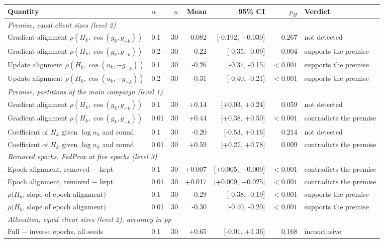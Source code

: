 \begin{tabular}{llrrrrl}
\toprule
Quantity & $\alpha$ & $n$ & Mean & 95\% CI & $p_H$ & Verdict \\
\midrule
\multicolumn{7}{l}{\textit{Premise, equal client sizes (level 2)}} \\
Gradient alignment $\rho(H_k, \cos(g_k, g_{-k}))$ & 0.1 & 30 & -0.082 & [-0.192, +0.030] & 0.267 & not detected \\
Gradient alignment $\rho(H_k, \cos(g_k, g_{-k}))$ & 0.2 & 30 & -0.22 & [-0.35, -0.09] & 0.004 & supports the premise \\
Update alignment $\rho(H_k, \cos(u_k, -g_{-k}))$ & 0.1 & 30 & -0.26 & [-0.37, -0.15] & $<0.001$ & supports the premise \\
Update alignment $\rho(H_k, \cos(u_k, -g_{-k}))$ & 0.2 & 30 & -0.31 & [-0.40, -0.21] & $<0.001$ & supports the premise \\
\multicolumn{7}{l}{\textit{Premise, partitions of the main campaign (level 1)}} \\
Gradient alignment $\rho(H_k, \cos(g_k, g_{-k}))$ & 0.1 & 30 & +0.14 & [+0.03, +0.24] & 0.059 & not detected \\
Gradient alignment $\rho(H_k, \cos(g_k, g_{-k}))$ & 0.01 & 30 & +0.44 & [+0.38, +0.50] & $<0.001$ & contradicts the premise \\
Coefficient of $H_k$ given $\log n_k$ and round & 0.1 & 30 & -0.20 & [-0.53, +0.16] & 0.214 & not detected \\
Coefficient of $H_k$ given $\log n_k$ and round & 0.01 & 30 & +0.59 & [+0.27, +0.78] & 0.009 & contradicts the premise \\
\multicolumn{7}{l}{\textit{Removed epochs, FedProx at five epochs (level 3)}} \\
Epoch alignment, removed $-$ kept & 0.1 & 30 & +0.007 & [+0.005, +0.009] & $<0.001$ & contradicts the premise \\
Epoch alignment, removed $-$ kept & 0.01 & 30 & +0.017 & [+0.009, +0.025] & $<0.001$ & contradicts the premise \\
$\rho(H_k$, slope of epoch alignment$)$ & 0.1 & 30 & -0.29 & [-0.38, -0.19] & $<0.001$ & supports the premise \\
$\rho(H_k$, slope of epoch alignment$)$ & 0.01 & 30 & -0.30 & [-0.40, -0.20] & $<0.001$ & supports the premise \\
\multicolumn{7}{l}{\textit{Allocation, equal client sizes (level 2), accuracy in pp}} \\
Full $-$ inverse epochs, all seeds & 0.1 & 30 & +0.65 & [-0.01, +1.36] & 0.168 & inconclusive \\

\end{tabular}
